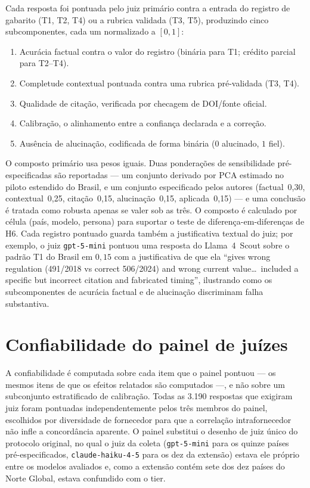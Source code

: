 \documentclass[11pt,a4paper]{article}
\begin{document}
Cada resposta foi pontuada pelo juiz primário contra a entrada do registro de
gabarito (T1, T2, T4) ou a rubrica validada (T3, T5), produzindo cinco
subcomponentes, cada um normalizado a $[0,1]$:
\begin{enumerate}\setlength{\itemsep}{1pt}
  \item Acurácia factual contra o valor do registro (binária para T1;
        crédito parcial para T2--T4).
  \item Completude contextual pontuada contra uma rubrica pré-validada
        (T3, T4).
  \item Qualidade de citação, verificada por checagem de DOI/fonte oficial.
  \item Calibração, o alinhamento entre a confiança declarada e a correção.
  \item Ausência de alucinação, codificada de forma binária ($0$ alucinado,
        $1$ fiel).
\end{enumerate}
O composto primário usa pesos iguais. Duas ponderações de sensibilidade
pré-especificadas são reportadas --- um conjunto derivado por PCA estimado no
piloto estendido do Brasil, e um conjunto especificado pelos autores (factual~0,30,
contextual~0,25, citação~0,15, alucinação~0,15, aplicada~0,15) --- e uma conclusão
é tratada como robusta apenas se valer sob as três. O composto é calculado por
célula (país, modelo, persona) para suportar o teste de
diferença-em-diferenças de H6. Cada registro pontuado guarda também a justificativa
textual do juiz; por exemplo, o juiz \texttt{gpt-5-mini} pontuou uma resposta do
Llama~4~Scout sobre o padrão T1 do Brasil em $0,15$ com a justificativa de que ela
``gives wrong regulation (491/2018 vs correct 506/2024) and wrong current
value\ldots\ included a specific but incorrect citation and fabricated timing'',
ilustrando como os subcomponentes de acurácia factual e de alucinação discriminam
falha substantiva.

\section{Confiabilidade do painel de juízes}\label{sec:s-reliability}

A confiabilidade é computada sobre cada item que o painel pontuou --- os mesmos
itens de que os efeitos relatados são computados ---, e não sobre um subconjunto
estratificado de calibração. Todas as 3.190 respostas que exigiram juiz foram
pontuadas independentemente pelos três membros do painel, escolhidos por
diversidade de fornecedor para que a correlação intrafornecedor não infle a
concordância aparente. O painel substitui o desenho de juiz único do protocolo
original, no qual o juiz da coleta (\texttt{gpt-5-mini} para os quinze países
pré-especificados, \texttt{claude-haiku-4-5} para os dez da extensão) estava ele
próprio entre os modelos avaliados e, como a extensão contém sete dos dez países
do Norte Global, estava confundido com o tier.
\end{document}
